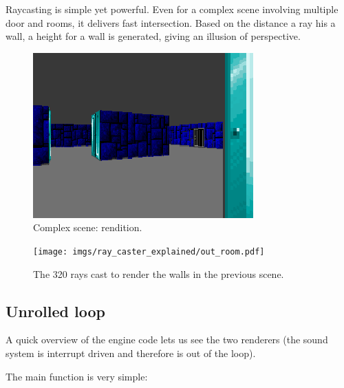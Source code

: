 \documentclass[book.tex]{subfiles}
\begin{document}
Raycasting is simple yet powerful. Even for a complex scene involving multiple door and rooms, it delivers fast intersection. Based on the distance a ray his a wall, a height for a wall is generated, giving an illusion of perspective.
\begin{figure}[H]
  \centering
 \includegraphics[width=\textwidth]{imgs/ray_caster_explained/out_door.png}
 \caption{Complex scene: rendition.} 
\end{figure}
\par
\begin{figure}[H]
\centering
 \texttt{[image: imgs/ray\_caster\_explained/out\_room.pdf]}
 \caption{The 320 rays cast to render the walls in the previous scene.} \label{fig:Raycasting2}
\end{figure}


\subsection{Unrolled loop}
A quick overview of the engine code lets us see the two renderers (the sound system is interrupt driven and therefore is out of the loop).\\
\par
The main function is very simple:\\
\par
\begin{minipage}{\textwidth}

\end{minipage}
\par
\end{document}
